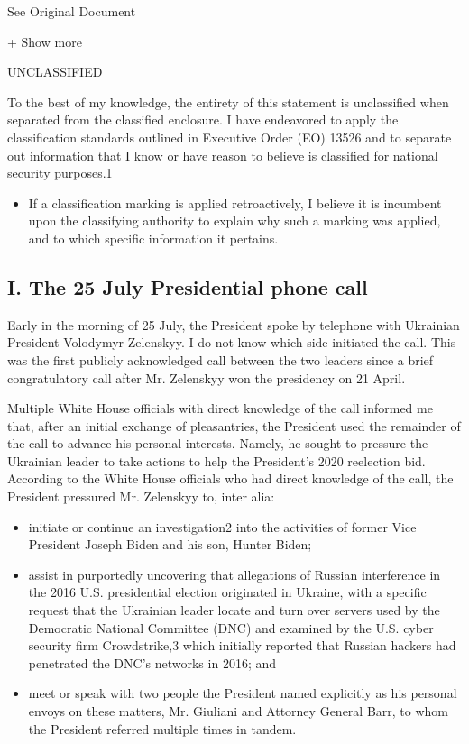 See Original Document

+ Show more

UNCLASSIFIED

To the best of my knowledge, the entirety of this statement is
unclassified when separated from the classified enclosure. I have
endeavored to apply the classification standards outlined in Executive
Order (EO) 13526 and to separate out information that I know or have
reason to believe is classified for national security purposes.1

\begin{itemize}
\tightlist
\item
  If a classification marking is applied retroactively, I believe it is
  incumbent upon the classifying authority to explain why such a marking
  was applied, and to which specific information it pertains.
\end{itemize}

\hypertarget{i-the-25-july-presidential-phone-call}{%
\subsection{I. The 25 July Presidential phone
call}\label{i-the-25-july-presidential-phone-call}}

Early in the morning of 25 July, the President spoke by telephone with
Ukrainian President Volodymyr Zelenskyy. I do not know which side
initiated the call. This was the first publicly acknowledged call
between the two leaders since a brief congratulatory call after Mr.
Zelenskyy won the presidency on 21 April.

Multiple White House officials with direct knowledge of the call
informed me that, after an initial exchange of pleasantries, the
President used the remainder of the call to advance his personal
interests. Namely, he sought to pressure the Ukrainian leader to take
actions to help the President's 2020 reelection bid. According to the
White House officials who had direct knowledge of the call, the
President pressured Mr. Zelenskyy to, inter alia:

\begin{itemize}
\tightlist
\item
  initiate or continue an investigation2 into the activities of former
  Vice President Joseph Biden and his son, Hunter Biden;
\item
  assist in purportedly uncovering that allegations of Russian
  interference in the 2016 U.S. presidential election originated in
  Ukraine, with a specific request that the Ukrainian leader locate and
  turn over servers used by the Democratic National Committee (DNC) and
  examined by the U.S. cyber security firm Crowdstrike,3 which initially
  reported that Russian hackers had penetrated the DNC's networks in
  2016; and
\item
  meet or speak with two people the President named explicitly as his
  personal envoys on these matters, Mr. Giuliani and Attorney General
  Barr, to whom the President referred multiple times in tandem.
\end{itemize}

